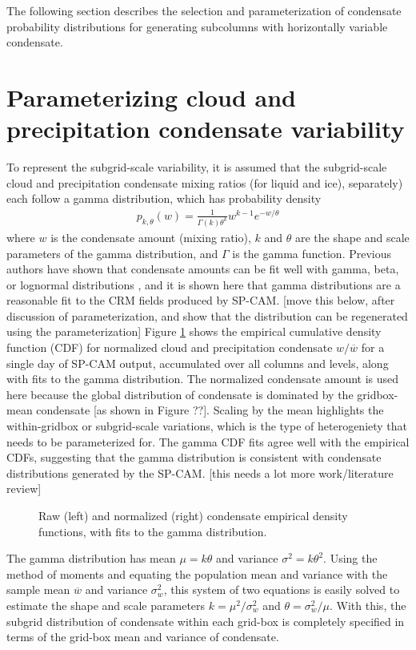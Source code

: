 The following section describes the selection and parameterization of condensate probability distributions for generating subcolumns with horizontally variable condensate.

\section{Parameterizing cloud and precipitation condensate variability}
To represent the subgrid-scale variability, it is assumed that the subgrid-scale cloud and precipitation condensate mixing ratios (for liquid and ice), separately) each follow a gamma distribution, which has probability density
\begin{gather}
    p_{k, \theta}(w) = \frac{1}{\Gamma(k) \theta^k} w^{k - 1} e^{-w/\theta}
\end{gather}
where $w$ is the condensate amount (mixing ratio), $k$ and $\theta$ are the shape and scale parameters of the gamma distribution, and $\Gamma$ is the gamma function. Previous authors have shown that condensate amounts can be fit well with gamma, beta, or lognormal distributions \citep[e.g.,][]{lee_et_al_2010}, and it is shown here that gamma distributions are a reasonable fit to the CRM fields produced by SP-CAM. [move this below, after discussion of parameterization, and show that the distribution can be regenerated using the parameterization] Figure \ref{sgi_condensate_cdf} shows the empirical cumulative density function (CDF) for normalized cloud and precipitation condensate $w / \overline{w}$ for a single day of SP-CAM output, accumulated over all columns and levels, along with fits to the gamma distribution. The normalized condensate amount is used here because the global distribution of condensate is dominated by the gridbox-mean condensate [as shown in Figure ??]. Scaling by the mean highlights the within-gridbox or subgrid-scale variations, which is the type of heterogeniety that needs to be parameterized for. The gamma CDF fits agree well with the empirical CDFs, suggesting that the gamma distribution is consistent with condensate distributions generated by the SP-CAM. [this needs a lot more work/literature review]
\begin{figure}
\centering
\caption{Raw (left) and normalized (right) condensate empirical density functions, with fits to the gamma distribution.}
\label{sgi_condensate_cdf}
\end{figure}

The gamma distribution has mean $\mu = k\theta$ and variance $\sigma^2 = k \theta^2$. Using the method of moments \citep[e.g.,][]{wilks_2011} and equating the population mean and variance with the sample mean $\overline{w}$ and variance $\sigma_w^2$, this system of two equations is easily solved to estimate the shape and scale parameters $k = \mu^2 / \sigma_w^2$ and $\theta = \sigma_w^2 / \mu$. With this, the subgrid distribution of condensate within each grid-box is completely specified in terms of the grid-box mean and variance of condensate.

